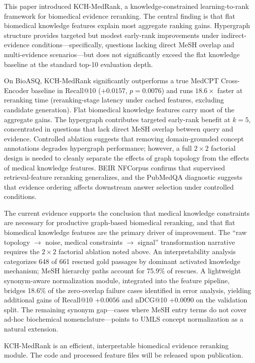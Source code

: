 This paper introduced KCH-MedRank, a knowledge-constrained learning-to-rank framework for biomedical evidence reranking. The central finding is that flat biomedical knowledge features explain most aggregate ranking gains. Hypergraph structure provides targeted but modest early-rank improvements under indirect-evidence conditions---specifically, questions lacking direct MeSH overlap and multi-evidence scenarios---but does not significantly exceed the flat knowledge baseline at the standard top-10 evaluation depth.

On BioASQ, KCH-MedRank significantly outperforms a true MedCPT Cross-Encoder baseline in Recall@10 ($+0.0157$, $p=0.0076$) and runs $18.6\times$ faster at reranking time (reranking-stage latency under cached features, excluding candidate generation). Flat biomedical knowledge features carry most of the aggregate gains. The hypergraph contributes targeted early-rank benefit at $k{=}5$, concentrated in questions that lack direct MeSH overlap between query and evidence. Controlled ablation suggests that removing domain-grounded concept annotations degrades hypergraph performance; however, a full $2 \times 2$ factorial design is needed to cleanly separate the effects of graph topology from the effects of medical knowledge features. BEIR NFCorpus confirms that supervised retrieval-feature reranking generalizes, and the PubMedQA diagnostic suggests that evidence ordering affects downstream answer selection under controlled conditions.

The current evidence supports the conclusion that medical knowledge constraints are necessary for productive graph-based biomedical reranking, and that flat biomedical knowledge features are the primary driver of improvement. The ``raw topology $\to$ noise, medical constraints $\to$ signal'' transformation narrative requires the $2 \times 2$ factorial ablation noted above. An interpretability analysis categorizes 648 of 661 rescued gold passages by dominant activated knowledge mechanism; MeSH hierarchy paths account for 75.9\% of rescues. A lightweight synonym-aware normalization module, integrated into the feature pipeline, bridges 18.6\% of the zero-overlap failure cases identified in error analysis, yielding additional gains of Recall@10 $+0.0056$ and nDCG@10 $+0.0090$ on the validation split. The remaining synonym gap---cases where MeSH entry terms do not cover ad-hoc biochemical nomenclature---points to UMLS concept normalization as a natural extension.

KCH-MedRank is an efficient, interpretable biomedical evidence reranking module. The code and processed feature files will be released upon publication.
